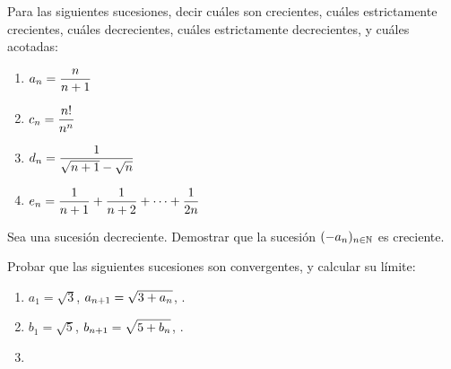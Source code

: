     \item Para las siguientes sucesiones, decir cuáles son crecientes, cuáles estrictamente crecientes, cuáles decrecientes, cuáles estrictamente decrecientes, y cuáles acotadas:
    \begin{multicols}{2}
        \begin{enumerate}
        \item $\displaystyle a_n = \frac{n}{n+1}$
        \item $\displaystyle c_n = \frac{n!}{n^n}$
        \item $\displaystyle d_n = \frac{1}{\sqrt{n+1}-\sqrt{n}}$
        \item $\displaystyle e_n = \frac{1}{n+1} + \frac{1}{n+2} + \dots + \frac{1}{2n}$
    \end{enumerate}
    \end{multicols}
\item Sea \sucan una sucesión decreciente. Demostrar que la sucesión $(-a_n)_{{n\in\mathbb{N}}}$ es creciente.


\item Probar que las siguientes sucesiones son convergentes, y calcular su límite:
    \begin{enumerate}
        \item $a_1 = \sqrt3$, $\displaystyle a_{n+1} = \sqrt{3+a_n}$, \niN.
        \item $b_1 = \sqrt5$, $\displaystyle b_{n+1} = \sqrt{5+b_n}$, \niN.
        \item {}
    \end{enumerate}

